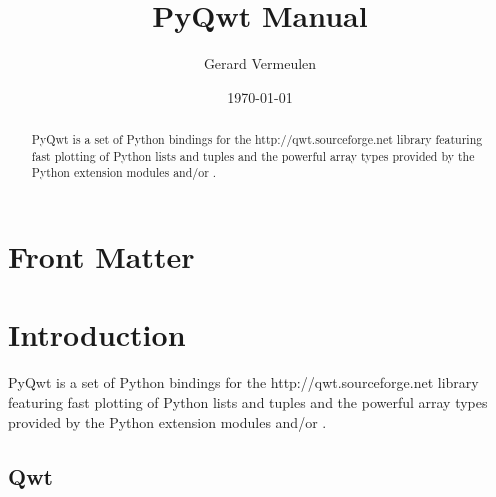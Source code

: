 \documentclass{manual}
\title{PyQwt Manual}
\author{Gerard Vermeulen}
\date{\today}
\newcommand{\Qwt}{\ulink{Qwt}
  {http://qwt.sourceforge.net}}
\begin{document}
\maketitle

\ifhtml
\chapter*{Front Matter \label{front}}
\fi




\begin{abstract}

\noindent
PyQwt is a set of Python bindings for the \Qwt{} library featuring fast
plotting of Python lists and tuples and the powerful array types provided by
the Python extension modules  and/or .

\end{abstract}

\tableofcontents

\chapter{Introduction \label{introduction}}

PyQwt is a set of Python bindings for the \Qwt{} library featuring fast
plotting of Python lists and tuples and the powerful array types provided
by the Python extension modules  and/or .


 
\section{Qwt \label{qwt-intro}}
\end{document}
